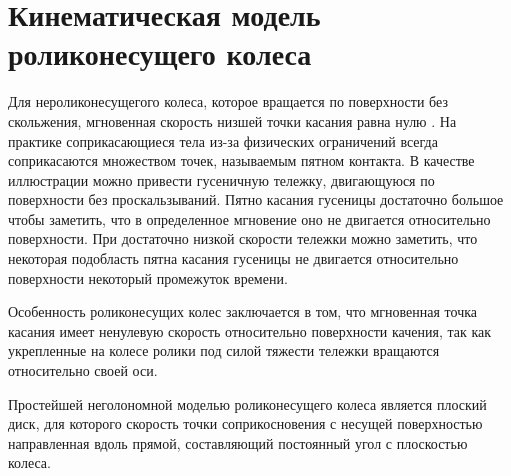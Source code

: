 \documentclass[oneside,final,14pt]{extreport}
\newcommand{\cmmnt}[1]{\ignorespaces}
\begin{document}
\chapter{Кинематическая модель роликонесущего колеса} 
\label{chap:MecanumWheelModel}
Для нероликонесущегого колеса, которое вращается по поверхности без скольжения, мгновенная скорость низшей точки касания равна нулю \cite{MecanumWheel}. На практике соприкасающиеся тела из-за физических ограничений всегда соприкасаются множеством точек, называемым пятном контакта. В качестве иллюстрации можно привести гусеничную тележку, двигающуюся по поверхности без проскальзываний. Пятно касания гусеницы достаточно большое чтобы заметить, что в определенное мгновение оно не двигается относительно поверхности. При достаточно низкой скорости тележки можно заметить, что некоторая подобласть пятна касания гусеницы не двигается относительно поверхности некоторый промежуток времени. 

Особенность роликонесущих колес заключается в том, что мгновенная точка касания имеет ненулевую скорость относительно поверхности качения, так как укрепленные на колесе ролики под силой тяжести тележки вращаются относительно своей оси. \cmmnt{В случае всенаправленного колеса, оси роликов которого параллельны плоскости диска колеса, проскальзывания не происходит, что упрощает процесс построения математической модели}

 Простейшей неголономной моделью роликонесущего колеса является плоский диск, для которого скорость точки соприкосновения с несущей поверхностью направленная вдоль прямой, составляющий постоянный угол с плоскостью колеса.

\begin{figure}[H]
\end{figure}

\begin{figure}[H]
\end{figure}
\end{document}
